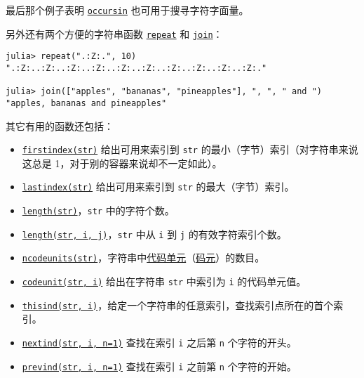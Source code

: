 最后那个例子表明 \hyperlink{7988132114328914630}{\texttt{occursin}} 也可用于搜寻字符字面量。



另外还有两个方便的字符串函数 \hyperlink{15426606278434194584}{\texttt{repeat}} 和 \hyperlink{18064910688022011979}{\texttt{join}}：




\begin{verbatim}
julia> repeat(".:Z:.", 10)
".:Z:..:Z:..:Z:..:Z:..:Z:..:Z:..:Z:..:Z:..:Z:..:Z:."

julia> join(["apples", "bananas", "pineapples"], ", ", " and ")
"apples, bananas and pineapples"
\end{verbatim}



其它有用的函数还包括：



\begin{itemize}
\item \hyperlink{16943669671291374223}{\texttt{firstindex(str)}} 给出可用来索引到 \texttt{str} 的最小（字节）索引（对字符串来说这总是 1，对于别的容器来说却不一定如此）。


\item \hyperlink{15780929618270241785}{\texttt{lastindex(str)}} 给出可用来索引到 \texttt{str} 的最大（字节）索引。


\item \hyperlink{3699181304419743826}{\texttt{length(str)}}，\texttt{str} 中的字符个数。


\item \hyperlink{3699181304419743826}{\texttt{length(str, i, j)}}，\texttt{str} 中从 \texttt{i} 到 \texttt{j} 的有效字符索引个数。


\item \hyperlink{1775518749150675445}{\texttt{ncodeunits(str)}}，字符串中\href{https://en.wikipedia.org/wiki/Character\_encoding\#Terminology}{代码单元}（\href{https://zh.wikipedia.org/wiki/字符编码\#字符集、代码页，与字符映射}{码元}）的数目。


\item \hyperlink{16983098119361955361}{\texttt{codeunit(str, i)}} 给出在字符串 \texttt{str} 中索引为 \texttt{i} 的代码单元值。


\item \hyperlink{11299403048911786045}{\texttt{thisind(str, i)}}，给定一个字符串的任意索引，查找索引点所在的首个索引。


\item \hyperlink{7455293228649070526}{\texttt{nextind(str, i, n=1)}} 查找在索引 \texttt{i} 之后第 \texttt{n} 个字符的开头。


\item \hyperlink{15871508897466976220}{\texttt{prevind(str, i, n=1)}} 查找在索引 \texttt{i} 之前第 \texttt{n} 个字符的开始。

\end{itemize}


